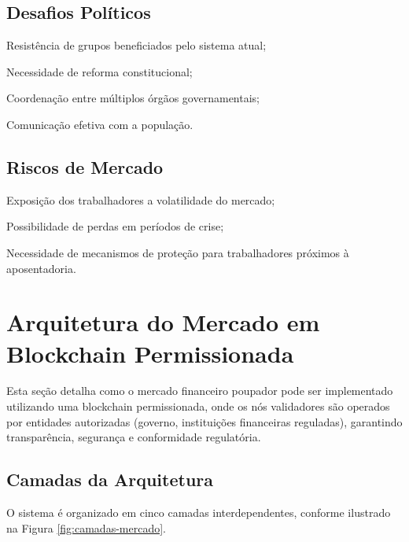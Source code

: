 \subsection{Desafios Políticos}

\begin{alineas}
    \item Resistência de grupos beneficiados pelo sistema atual;
    \item Necessidade de reforma constitucional;
    \item Coordenação entre múltiplos órgãos governamentais;
    \item Comunicação efetiva com a população.
\end{alineas}

\subsection{Riscos de Mercado}

\begin{alineas}
    \item Exposição dos trabalhadores a volatilidade do mercado;
    \item Possibilidade de perdas em períodos de crise;
    \item Necessidade de mecanismos de proteção para trabalhadores próximos à aposentadoria.
\end{alineas}

\section{Arquitetura do Mercado em Blockchain Permissionada}

Esta seção detalha como o mercado financeiro poupador pode ser implementado utilizando uma blockchain permissionada, onde os nós validadores são operados por entidades autorizadas (governo, instituições financeiras reguladas), garantindo transparência, segurança e conformidade regulatória.

\subsection{Camadas da Arquitetura}

O sistema é organizado em cinco camadas interdependentes, conforme ilustrado na Figura \ref{fig:camadas-mercado}.

